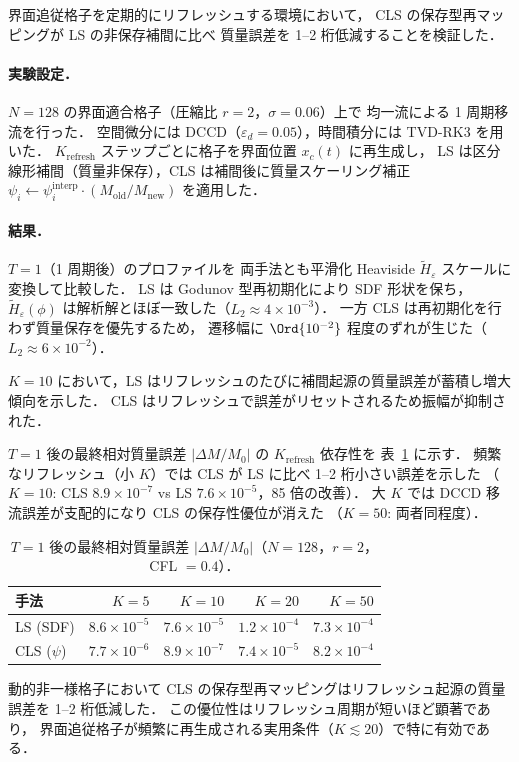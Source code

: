 %

界面追従格子を定期的にリフレッシュする環境において，
CLS の保存型再マッピングが LS の非保存補間に比べ
質量誤差を 1--2 桁低減することを検証した．

\paragraph{実験設定．}

$N=128$ の界面適合格子（圧縮比 $r=2$，$\sigma=0.06$）上で
均一流による 1 周期移流を行った．
空間微分には DCCD（$\varepsilon_d = 0.05$），時間積分には TVD-RK3 を用いた．
$K_{\mathrm{refresh}}$ ステップごとに格子を界面位置 $x_c(t)$ に再生成し，
LS は区分線形補間（質量非保存），CLS は補間後に質量スケーリング補正
$\psi_i \leftarrow \psi_i^{\mathrm{interp}} \cdot (M_{\mathrm{old}}/M_{\mathrm{new}})$
を適用した．

\paragraph{結果．}

$T=1$（1 周期後）のプロファイルを
両手法とも平滑化 Heaviside $\tilde{H}_\varepsilon$ スケールに変換して比較した．
LS は Godunov 型再初期化により SDF 形状を保ち，
$\tilde{H}_\varepsilon(\phi)$ は解析解とほぼ一致した（$L_2 \approx 4\times10^{-3}$）．
一方 CLS は再初期化を行わず質量保存を優先するため，
遷移幅に $\Ord{10^{-2}}$ 程度のずれが生じた（$L_2 \approx 6\times10^{-2}$）．

$K=10$ において，LS はリフレッシュのたびに補間起源の質量誤差が蓄積し増大傾向を示した．
CLS はリフレッシュで誤差がリセットされるため振幅が抑制された．

$T=1$ 後の最終相対質量誤差 $|\Delta M/M_0|$ の $K_{\mathrm{refresh}}$ 依存性を
表~\ref{tab:ls_cls_mass_err} に示す．
頻繁なリフレッシュ（小 $K$）では CLS が LS に比べ 1--2 桁小さい誤差を示した
（$K=10$: CLS $8.9\times10^{-7}$ vs LS $7.6\times10^{-5}$，85 倍の改善）．
大 $K$ では DCCD 移流誤差が支配的になり CLS の保存性優位が消えた
（$K=50$: 両者同程度）．

\begin{table}[htbp]
  \centering
  \caption{%
    $T=1$ 後の最終相対質量誤差 $|\Delta M/M_0|$（$N=128$，$r=2$，CFL $=0.4$）．}
  \label{tab:ls_cls_mass_err}
  \begin{tabular}{lrrrr}
    \toprule
    手法 & $K=5$ & $K=10$ & $K=20$ & $K=50$ \\
    \midrule
    LS (SDF)     & $8.6\times10^{-5}$ & $7.6\times10^{-5}$ & $1.2\times10^{-4}$ & $7.3\times10^{-4}$ \\
    CLS ($\psi$) & $7.7\times10^{-6}$ & $8.9\times10^{-7}$ & $7.4\times10^{-5}$ & $8.2\times10^{-4}$ \\
    \bottomrule
  \end{tabular}
\end{table}

動的非一様格子において CLS の保存型再マッピングはリフレッシュ起源の質量誤差を
1--2 桁低減した．
この優位性はリフレッシュ周期が短いほど顕著であり，
界面追従格子が頻繁に再生成される実用条件（$K \lesssim 20$）で特に有効である．
